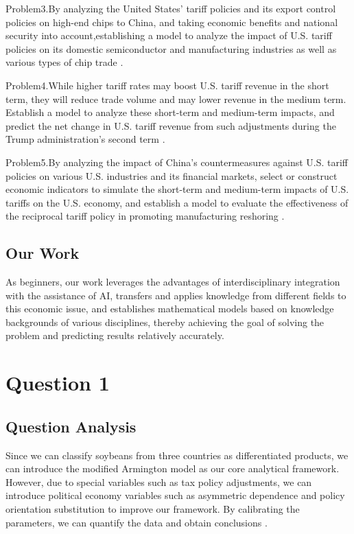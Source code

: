\documentclass{apmcmthesis}
\begin{document}
Problem3.By analyzing the United States' tariff policies and its export control policies on high-end chips to China, and taking economic benefits and national security into account,establishing a model to analyze the impact of U.S. tariff policies on its domestic semiconductor and manufacturing industries as well as various types of chip trade \cite{nist2025chips}.

Problem4.While higher tariff rates may boost U.S. tariff revenue in the short term, they will reduce trade volume and may lower revenue in the medium term. Establish a model to analyze these short-term and medium-term impacts, and predict the net change in U.S. tariff revenue from such adjustments during the Trump administration's second term \cite{cbo2025budget}.

Problem5.By analyzing the impact of China's countermeasures against U.S. tariff policies on various U.S. industries and its financial markets, select or construct economic indicators to simulate the short-term and medium-term impacts of U.S. tariffs on the U.S. economy, and establish a model to evaluate the effectiveness of the reciprocal tariff policy in promoting manufacturing reshoring \cite{piie2025tariff}.




\subsection{Our Work}
As beginners, our work leverages the advantages of interdisciplinary integration with the assistance of AI, transfers and applies knowledge from different fields to this economic issue, and establishes mathematical models based on knowledge backgrounds of various disciplines, thereby achieving the goal of solving the problem and predicting results relatively accurately.


\section{Question 1}
\subsection{Question Analysis}
Since we can classify soybeans from three countries as differentiated products, we can introduce the modified Armington model as our core analytical framework. However, due to special variables such as tax policy adjustments, we can introduce political economy variables such as asymmetric dependence and policy orientation substitution to improve our framework. By calibrating the parameters, we can quantify the data and obtain conclusions \cite{trademap2025}.
\end{document}
